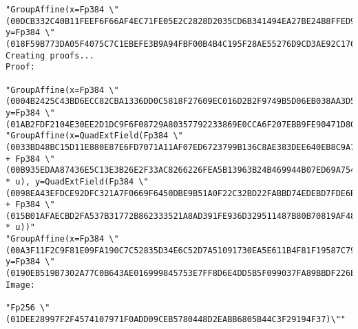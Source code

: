 \documentclass{article}
\begin{document}
\begin{lstlisting}
"GroupAffine(x=Fp384 \"(00DCB332C40B11FEEF6F66AF4EC71FE05E2C2828D2035CD6B341494EA27BE24B8FFED97FBED4F77DF823A871D12BD71D)\", y=Fp384 \"(018F59B773DA05F4075C7C1EBEFE3B9A94FBF00B4B4C195F28AE55276D9CD3AE92C17672E8B10E504387202599F16CB2)\")"
Creating proofs...
Proof:

"GroupAffine(x=Fp384 \"(0004B2425C43BD6ECC82CBA1336DD0C5818F27609EC016D2B2F9749B5D06EB038AA3D54CEF0532B301A3CC7B71553914)\", y=Fp384 \"(01AB2FDF2104E30EE2D1DC9F6F08729A80357792233869E0CCA6F207EBB9FE90471D80E1769337B279568C548EBE4DFD)\")"
"GroupAffine(x=QuadExtField(Fp384 \"(0033BD48BC15D11E880E87E6FD7071A11AF07ED6723799B136C8AE383DEE640EB8C9A70D269CE7485285FED7B521D2B7)\" + Fp384 \"(00B935EDAA87436E5C13E3B26E2F33AC8266226FEA5B13963B24B469944B07ED69A754B53FF0F52C4CFCD1C674A08531)\" * u), y=QuadExtField(Fp384 \"(0098EA43EFDCE92DFC321A7F0669F6450DBE9B51A0F22C32BD22FABBD74EDEBD7FDE6B56A672EFDE149BBE09249BEB22)\" + Fp384 \"(015B01AFAECBD2FA537B31772B862333521A8AD391FE936D329511487B80B70819AF48667C13537F345713F8DF16233D)\" * u))"
"GroupAffine(x=Fp384 \"(00A3F11F2C9F81E09FA190C7C52835D34E6C52D7A51091730EA5E611B4F81F19587C7962F87EAA6E53030AFFD75612EF)\", y=Fp384 \"(0190EB519B7302A77C0B643AE016999845753E7FF8D6E4DD5B5F099037FA89BBDF226E0F9EABB3A0C66785A25519B7BE)\")"
Image:

"Fp256 \"(01DEE28997F2F4574107971F0ADD09CEB5780448D2EABB6805B44C3F29194F37)\""
\end{lstlisting}
\end{document}
